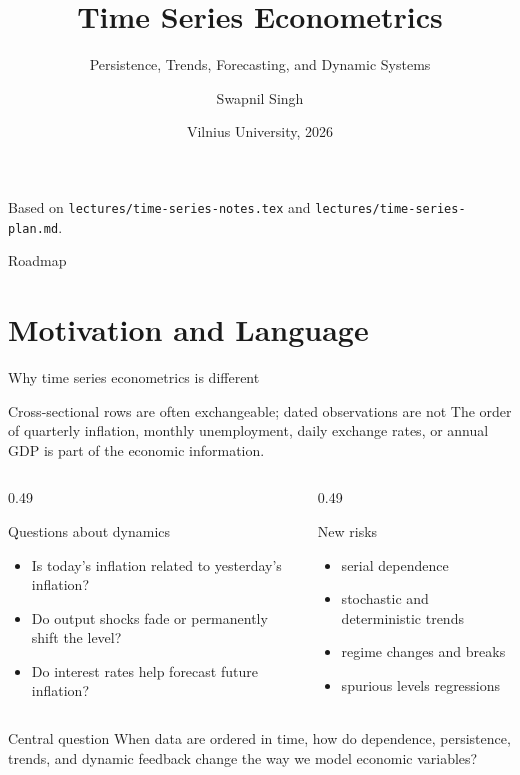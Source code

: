 \documentclass[10pt]{beamer}
\title{Time Series Econometrics}
\subtitle{Persistence, Trends, Forecasting, and Dynamic Systems}
\author{Swapnil Singh}
\institute{Lietuvos Bankas \and Kaunas University of Technology}
\date{Vilnius University, 2026}
\begin{document}
\begin{frame}[plain]
  \titlepage
  \vfill
  {\scriptsize\color{gray} Based on \texttt{lectures/time-series-notes.tex} and \texttt{lectures/time-series-plan.md}.}
\end{frame}

\begin{frame}{Roadmap}
\tableofcontents
\end{frame}

\section{Motivation and Language}

\begin{frame}{Why time series econometrics is different}
\label{slide:why_ts}
\small
\begin{block}{Cross-sectional rows are often exchangeable; dated observations are not}
The order of quarterly inflation, monthly unemployment, daily exchange rates, or annual GDP is part of the economic information.
\end{block}

\begin{columns}[T]
\begin{column}{0.49\textwidth}
\begin{exampleblock}{Questions about dynamics}
\begin{itemize}
  \item Is today's inflation related to yesterday's inflation?
  \item Do output shocks fade or permanently shift the level?
  \item Do interest rates help forecast future inflation?
\end{itemize}
\end{exampleblock}
\end{column}
\begin{column}{0.49\textwidth}
\begin{alertblock}{New risks}
\begin{itemize}
  \item serial dependence
  \item stochastic and deterministic trends
  \item regime changes and breaks
  \item spurious levels regressions
\end{itemize}
\end{alertblock}
\end{column}
\end{columns}

\pause
\begin{block}{Central question}
When data are ordered in time, how do dependence, persistence, trends, and dynamic feedback change the way we model economic variables?
\end{block}
\end{frame}
\end{document}
